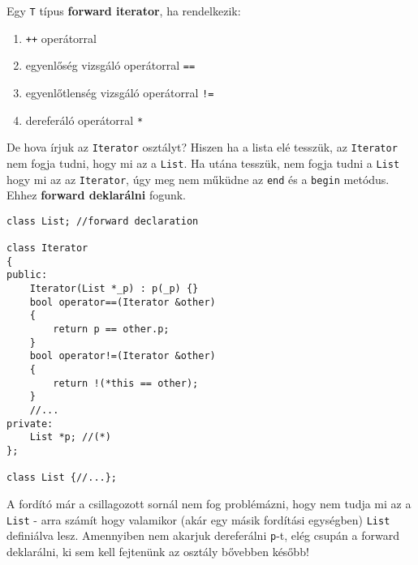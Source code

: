 \documentclass[a4paper,11.5pt,table]{article}
\begin{document}
	Egy \texttt{T} típus \textbf{forward iterator}, ha rendelkezik:
	\begin{enumerate}
		\item \texttt{++} operátorral
		\item egyenlőség vizsgáló operátorral \texttt{==}
		\item egyenlőtlenség vizsgáló operátorral \texttt{!=}
		\item dereferáló operátorral \texttt{*}
	\end{enumerate}
	De hova írjuk az \texttt{Iterator} osztályt? Hiszen ha a lista elé tesszük, az \texttt{Iterator} nem fogja tudni, hogy mi az a \texttt{List}. Ha utána tesszük, nem fogja tudni a \texttt{List} hogy mi az az \texttt{Iterator}, úgy meg nem műküdne az \texttt{end} és a \texttt{begin} metódus. Ehhez \textbf{forward deklarálni} fogunk.
	\begin{lstlisting}
class List; //forward declaration

class Iterator
{
public:
	Iterator(List *_p) : p(_p) {}
	bool operator==(Iterator &other)
	{
		return p == other.p;
	}
	bool operator!=(Iterator &other)
	{
		return !(*this == other);
	}
	//...
private:
	List *p; //(*)
};

class List {//...};
	\end{lstlisting}
	A fordító már a csillagozott sornál nem fog problémázni, hogy nem tudja mi az a \texttt{List} - arra számít hogy valamikor (akár egy másik fordítási egységben) \texttt{List} definiálva lesz. Amennyiben nem akarjuk dereferálni \texttt{p}-t, elég csupán a forward deklarálni, ki sem kell fejtenünk az osztály bővebben később!
	
\end{document}
